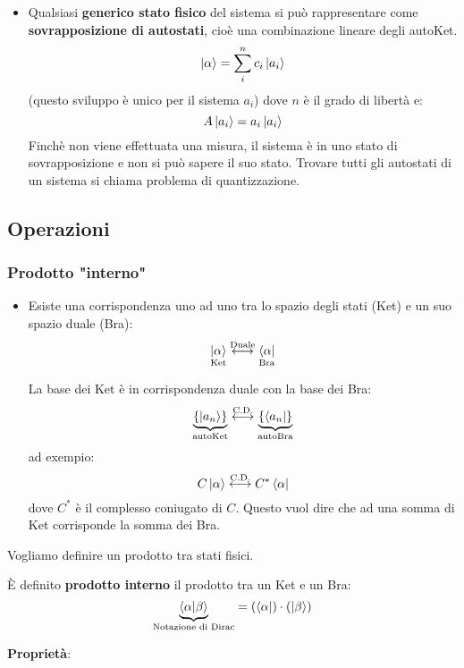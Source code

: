 \documentclass[a4paper]{article}
\begin{document}
\begin{itemize}
  \item Qualsiasi \textbf{generico stato fisico} del sistema si può rappresentare come 
    \textbf{sovrapposizione di autostati}, cioè una combinazione lineare degli autoKet.
    \[
      \ket{\alpha} = \sum_i^n c_i \ket{a_i}
    \] 
    (questo sviluppo è unico per il sistema \( a_i \))
    dove \( n \) è il grado di libertà e:
    \[
      A \ket{a_i} = a_i \ket{a_i}
    \] 
    Finchè non viene effettuata una misura, il sistema è in uno stato di sovrapposizione
    e non si può sapere il suo stato.
    \vspace{1em}
    \noindent
    Trovare tutti gli autostati di un sistema si chiama problema di quantizzazione.
\end{itemize}

\subsection{Operazioni}
\subsubsection{Prodotto "interno"}
\begin{itemize}
  \item Esiste una corrispondenza uno ad uno tra lo spazio degli stati (Ket) e un suo
    spazio duale (Bra):
    \[
      \underset{\text{Ket}}{\ket{\alpha}} \stackrel{\text{Duale}}{\longleftrightarrow} 
      \underset{\text{Bra}}{\bra{\alpha}}
    \] 

    La base dei Ket è in corrispondenza duale con la base dei Bra:
    \[
      \underbrace{\{\ket{a_n}\}}_{\text{autoKet}} \stackrel{\text{C.D.}}{\longleftrightarrow}
      \underbrace{\{\bra{a_n}\}}_{\text{autoBra}}
    \]
    ad exempio:
    \[
      C \ket{\alpha} \stackrel{\text{C.D.}}{\longleftrightarrow} C^* \bra{\alpha}
    \] 
    dove \( C^* \) è il complesso coniugato di \( C \). Questo vuol dire che ad una
    somma di Ket corrisponde la somma dei Bra.
\end{itemize}
Vogliamo definire un prodotto tra stati fisici.
\begin{definition}
  È definito \textbf{prodotto interno} il prodotto tra un Ket e un Bra:
  \[
    \underbrace{\braket{\alpha}{\beta}}_{\text{Notazione di Dirac}} = \left(\bra{\alpha}\right) \cdot \left(\ket{\beta}\right)
  \] 
\end{definition}

\vspace{1em}
\noindent
\textbf{Proprietà}:
\end{document}

